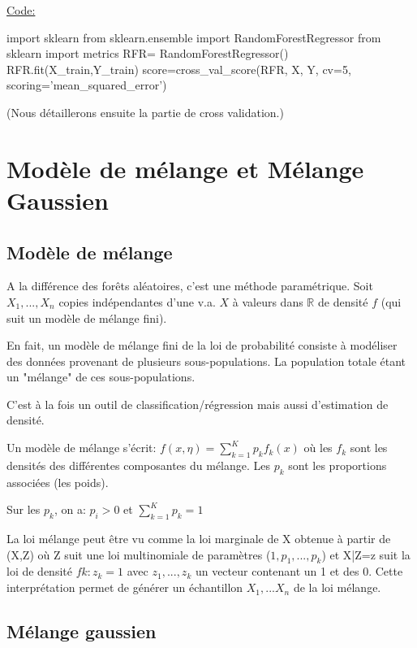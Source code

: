 \documentclass[a4paper,oneside,11pt]{article}
\begin{document}
\underline{Code:}
\begin{code-Python}
import sklearn
from sklearn.ensemble import RandomForestRegressor 
from sklearn import metrics
RFR= RandomForestRegressor()
RFR.fit(X_train,Y_train)
score=cross_val_score(RFR, X, Y, cv=5, scoring='mean_squared_error')
\end{code-Python}

(Nous détaillerons ensuite la partie de cross validation.)

\newpage
\section*{Modèle de mélange et Mélange Gaussien}
%

\subsection*{Modèle de mélange}
%

\qquad A la différence des forêts aléatoires, c'est une méthode paramétrique.
Soit $X_1,...,X_n$ copies indépendantes d'une v.a. $X$ à valeurs dans $\mathbb{R}$ de densité $f$ (qui suit un modèle de mélange fini).

En fait, un modèle de mélange fini de la loi de probabilité consiste à modéliser des données provenant de plusieurs sous-populations. La population totale étant un "mélange" de ces sous-populations.

C'est à la fois un outil de classification/régression mais aussi d'estimation de densité.

Un modèle de mélange s'écrit:
$f(x,\eta)=\sum_{k=1}^{K}p_{k}f_{k}(x)$
où les $f_k $ sont les densités des différentes composantes du mélange.
Les $p_k$ sont les proportions associées (les poids).

Sur les $p_k$, on a:
$p_i >0 $ et $\sum_{k=1}^{K}p_{k}=1$

La loi mélange peut être vu comme la loi marginale de X obtenue à partir de (X,Z) où Z suit une loi multinomiale de paramètres ($1,p_1,...,p_k$) et
X|Z=z suit la loi de densité $f{k:z_{k}=1}$ avec ${z_{1},...,z_{k}}$ un vecteur contenant un 1 et des 0.
Cette interprétation permet de générer un échantillon $X_1,...X_n$ de la loi mélange.   

\subsection*{Mélange gaussien}
%
\end{document}
